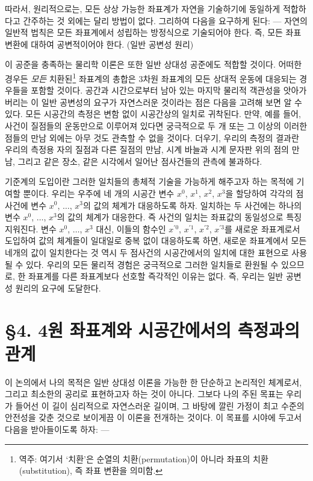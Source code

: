 따라서, 원리적으로는, 모든 상상 가능한 좌표계가 자연을 기술하기에 동일하게 적합하다고 간주하는 것 외에는 달리 방법이 없다. 그리하여 다음을 요구하게 된다: --- 자연의 일반적 법칙은 모든 좌표계에서 성립하는 방정식으로 기술되어야 한다. 즉, 모든 좌표 변환에 대하여 공변적이어야 한다. (일반 공변성 원리)

이 공준을 충족하는 물리학 이론은 또한 일반 상대성 공준에도 적합할 것이다. 어떠한 경우든 \emph{모든} 치환된\footnote{역주: 여기서 `치환'은 순열의 치환(permutation)이 아니라 좌표의 치환(substitution), 즉 좌표 변환을 의미함.} 좌표계의 총합은 3차원 좌표계의 모든 상대적 운동에 대응되는 경우들을 포함할 것이다. 공간과 시간으로부터 남아 있는 마지막 물리적 객관성을 앗아가 버리는 이 일반 공변성의 요구가 자연스러운 것이라는 점은 다음을 고려해 보면 알 수 있다. 모든 시공간의 측정은 변함 없이 시공간상의 일치로 귀착된다. 만약, 예를 들어, 사건이 질점들의 운동만으로 이루어져 있다면 궁극적으로 두 개 또는 그 이상의 이러한 점들의 만남 외에는 아무 것도 관측할 수 없을 것이다. 더우기, 우리의 측정의 결과란 우리의 측정용 자의 질점과 다른 질점의 만남, 시계 바늘과 시계 문자판 위의 점의 만남, 그리고 같은 장소, 같은 시각에서 일어난 점사건들의 관측에 불과하다.

기준계의 도입이란 그러한 일치들의 총체적 기술을 가능하게 해주고자 하는 목적에 기여할 뿐이다. 우리는 우주에 네 개의 시공간 변수 $x^0$, $x^1$, $x^2$, $x^3$을 할당하여 각각의 점사건에 변수 $x^0$, $\dots$, $x^3$의 값의 체계가 대응하도록 하자. 일치하는 두 사건에는 하나의 변수 $x^0$, $\dots$, $x^3$의 값의 체계가 대응한다. 즉 사건의 일치는 좌표값의 동일성으로 특징지워진다. 변수 $x^0$, $\dots$, $x^3$ 대신, 이들의 함수인 $x^{\prime0}$, $x^{\prime1}$, $x^{\prime2}$, $x^{\prime3}$를 새로운 좌표계로서 도입하여 값의 체계들이 일대일로 중복 없이 대응하도록 하면, 새로운 좌표계에서 모든 네개의 값이 일치한다는 것 역시 두 점사건의 시공간에서의 일치에 대한 표현으로 사용될 수 있다. 우리의 모든 물리적 경험은 궁극적으로 그러한 일치들로 환원될 수 있으므로, 한 좌표계를 다른 좌표계보다 선호할 즉각적인 이유는 없다. 즉, 우리는 일반 공변성 원리의 요구에 도달한다.

\section*{\S 4. 4원 좌표계와 시공간에서의 측정과의 관계}

이 논의에서 나의 목적은 일반 상대성 이론을 가능한 한 단순하고 논리적인 체계로서, 그리고 최소한의 공리로 표현하고자 하는 것이 아니다. 그보다 나의 주된 목표는 우리가 들어선 이 길이 심리적으로 자연스러운 길이며, 그 바탕에 깔린 가정이 최고 수준의 안전성을 갖춘 것으로 보이게끔 이 이론을 전개하는 것이다. 이 목표를 시야에 두고서 다음을 받아들이도록 하자: ---

